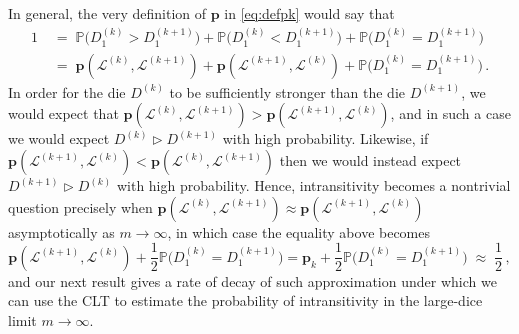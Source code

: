\documentclass[reqno,a4paper,11pt]{amsart}
\newcommand{\btt}{\triangleright}
\theoremstyle{remark}
\newcommand{\mc}[1]{{\mathcal #1}}
\newcommand{\mb}[1]{{\mathbf #1}}
\newcommand{\bb}[1]{{\mathbb #1}}
\numberwithin{equation}{section}
\begin{document}
In general, the very definition of $\mb p$ in \eqref{eq:defpk} would say that
%
\begin{align}\label{eq:identitypksymm}
    1 & \;=\;\bb P\big(D_1^{(k)}>D_1^{(k+1)}\big)+\bb
        P\big(D_1^{(k)}<D_1^{(k+1)}\big)+\bb
        P\big(D_1^{(k)}=D_1^{(k+1)}\big)\nonumber\\
    & \;=\;  \mb p(\mc L^{(k)},\mc L^{(k+1)})+ \mb p(\mc L^{(k+1)},\mc L^{(k)})+\bb P\big(D_1^{(k)}=D_1^{(k+1)}\big)\,.
\end{align}
%
In order for the die $D^{(k)}$ to be sufficiently stronger than the die $D^{(k+1)}$, we would expect that $\mb p(\mc L^{(k)},\mc L^{(k+1)})>\mb p(\mc L^{(k+1)},\mc L^{(k)})$, and in such a case we would expect $D^{(k)} \btt D^{(k+1)}$ with high probability. Likewise, if $\mb p(\mc L^{(k+1)},\mc L^{(k)})<\mb p(\mc L^{(k)},\mc L^{(k+1)})$ then we would instead expect $D^{(k+1)} \btt D^{(k)}$ with high probability. Hence, intransitivity becomes a nontrivial question precisely when $\mb p(\mc L^{(k)},\mc L^{(k+1)})\approx \mb p(\mc L^{(k+1)},\mc L^{(k)})$ asymptotically as $m\to\infty$, in which case the equality above becomes
%
$$
\mb p(\mc L^{(k+1)},\mc L^{(k)})+\frac{1}{2}\bb P\big(D_1^{(k)}=D_1^{(k+1)}\big)=\mb p_k+\frac{1}{2}\bb P\big(D_1^{(k)}=D_1^{(k+1)}\big)\;\approx\; \frac{1}{2}\,,
$$
%
and our next result gives a rate of decay of such approximation under which we can use the CLT to estimate the probability of intransitivity in the large-dice limit $m\to\infty$.
\end{document}
